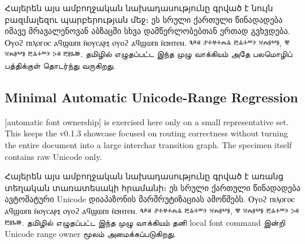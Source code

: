 Հայերեն այս ամբողջական նախադասությունը գրված է նույն բազմալեզու պարբերության մեջ։
ეს სრული ქართული წინადადება იმავე მრავალენოვან აბზაცში სხვა დამწერლობებთან ერთად გვხვდება.
Ⲟⲩⲟϩ ⲡⲓⲗⲟⲅⲟⲥ ⲁϥϣⲱⲡⲓ ⲛ̀ⲟⲩⲥⲁⲣⲝ ⲟⲩⲟϩ ⲁϥϣⲱⲡⲓ ⲛ̀ϧⲏⲧⲉⲛ.
Ⰲⱏ ⱀⰰⱍⰰⰾⱑ ⰱⱑⰰⱎⰵ ⱄⰾⱁⰲⱁ, ⰺ ⱄⰾⱁⰲⱁ ⰱⱑⰰⱎⰵ ⰽⱏ ⰱⱁⰳⱆ.
தமிழில் எழுதப்பட்ட இந்த முழு வாக்கியம் அதே பலமொழிப் பத்திக்குள் தொடர்ந்து வருகிறது.

\subsection{Minimal Automatic Unicode-Range Regression}

[automatic font ownership] is exercised here only on a small representative
set. This keeps the v0.1.3 showcase focused on routing correctness without
turning the entire document into a large interchar transition graph. The
specimen itself contains raw Unicode only.


Հայերեն այս ամբողջական նախադասությունը գրված է առանց տեղական տառատեսակի հրամանի։
ეს სრული ქართული წინადადება ავტომატური Unicode დიაპაზონის მარშრუტიზაციას ამოწმებს.
Ⲟⲩⲟϩ ⲡⲓⲗⲟⲅⲟⲥ ⲁϥϣⲱⲡⲓ ⲛ̀ⲟⲩⲥⲁⲣⲝ ⲟⲩⲟϩ ⲁϥϣⲱⲡⲓ ⲛ̀ϧⲏⲧⲉⲛ.
Ⰲⱏ ⱀⰰⱍⰰⰾⱑ ⰱⱑⰰⱎⰵ ⱄⰾⱁⰲⱁ, ⰺ ⱄⰾⱁⰲⱁ ⰱⱑⰰⱎⰵ ⰽⱏ ⰱⱁⰳⱆ.
தமிழில் எழுதப்பட்ட இந்த முழு வாக்கியம் தனி local font command இன்றி Unicode range owner மூலம் அமைக்கப்படுகிறது.



